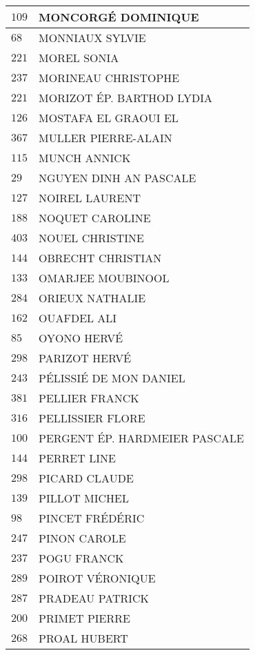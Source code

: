 \begin{xltabular}{\linewidth}{|l|X|}
    \hline
    $109$ & MONCORGÉ DOMINIQUE \\
    \hline
    $68$ & MONNIAUX SYLVIE \\
    \hline
    $221$ & MOREL SONIA \\
    \hline
    $237$ & MORINEAU CHRISTOPHE \\
    \hline
    $221$ & MORIZOT ÉP. BARTHOD LYDIA \\
    \hline
    $126$ & MOSTAFA EL GRAOUI EL \\
    \hline
    $367$ & MULLER PIERRE-ALAIN \\
    \hline
    $115$ & MUNCH ANNICK \\
    \hline
    $29$ & NGUYEN DINH AN PASCALE \\
    \hline
    $127$ & NOIREL LAURENT \\
    \hline
    $188$ & NOQUET CAROLINE \\
    \hline
    $403$ & NOUEL CHRISTINE \\
    \hline
    $144$ & OBRECHT CHRISTIAN \\
    \hline
    $133$ & OMARJEE MOUBINOOL \\
    \hline
    $284$ & ORIEUX NATHALIE \\
    \hline
    $162$ & OUAFDEL ALI \\
    \hline
    $85$ & OYONO HERVÉ \\
    \hline
    $298$ & PARIZOT HERVÉ \\
    \hline
    $243$ & PÉLISSIÉ DE MON DANIEL \\
    \hline
    $381$ & PELLIER FRANCK \\
    \hline
    $316$ & PELLISSIER FLORE \\
    \hline
    $100$ & PERGENT ÉP. HARDMEIER PASCALE \\
    \hline
    $144$ & PERRET LINE \\
    \hline
    $298$ & PICARD CLAUDE \\
    \hline
    $139$ & PILLOT MICHEL \\
    \hline
    $98$ & PINCET FRÉDÉRIC \\
    \hline
    $247$ & PINON CAROLE \\
    \hline
    $237$ & POGU FRANCK \\
    \hline
    $289$ & POIROT VÉRONIQUE \\
    \hline
    $287$ & PRADEAU PATRICK \\
    \hline
    $200$ & PRIMET PIERRE \\
    \hline
    $268$ & PROAL HUBERT \\

\end{xltabular}
